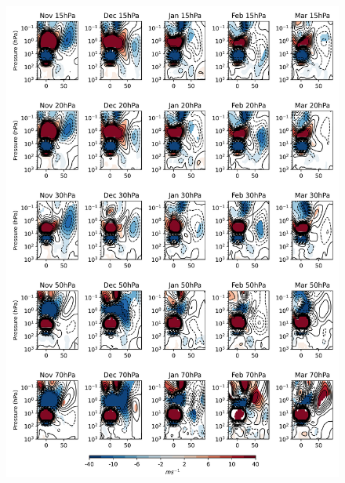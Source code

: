\newpage
\begin{figure}[h!]
\begin{center}
\noindent\includegraphics[width = 0.9\linewidth]{Figures/Figures-deepQBO/ZMZW_composites_by_month_QBO_phases_U_piclim_MarQBO_vs_Mar_70hPa_5thresh.png}
\caption[]{}
\label{fig:HT_piclim}
\end{center}
\end{figure}
\newpage

